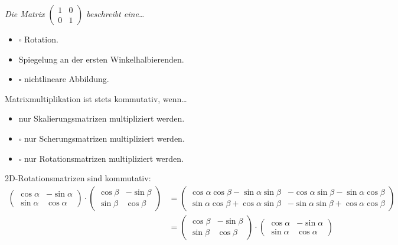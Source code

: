 \documentclass[a4paper]{scrartcl}
\begin{document}
\textit{Die Matrix $\begin{pmatrix}1 & 0\\
                     0 & 1\end{pmatrix}$ beschreibt eine\dots}
\begin{itemize}
    \item $\square$ Rotation.
    \item \CheckedBox Spiegelung an der ersten Winkelhalbierenden.
    \item $\square$ nichtlineare Abbildung.
\end{itemize}

Matrixmultiplikation ist stets kommutativ, wenn\dots
\begin{itemize}
    \item \CheckedBox nur Skalierungsmatrizen multipliziert werden.
    \item $\square$ nur Scherungsmatrizen multipliziert werden.
    \item $\square$ nur Rotationsmatrizen multipliziert werden.
\end{itemize}

2D-Rotationsmatrizen sind kommutativ:
\begin{align}
    \begin{pmatrix}\cos \alpha & -\sin \alpha\\
                   \sin \alpha & \cos \alpha\end{pmatrix} \cdot
    \begin{pmatrix}\cos \beta & -\sin \beta\\
                   \sin \beta & \cos \beta\end{pmatrix}
    &= \begin{pmatrix}\cos \alpha \cos \beta - \sin  \alpha \sin \beta & -\cos \alpha \sin \beta - \sin \alpha \cos \beta\\
                      \sin \alpha \cos \beta + \cos \alpha \sin \beta  & -\sin \alpha \sin \beta + \cos \alpha \cos \beta\end{pmatrix}\\
    &=\begin{pmatrix}\cos \beta & -\sin \beta\\
                   \sin \beta & \cos \beta\end{pmatrix} \cdot \begin{pmatrix}\cos \alpha & -\sin \alpha\\
                   \sin \alpha & \cos \alpha\end{pmatrix}
\end{align}
\end{document}
